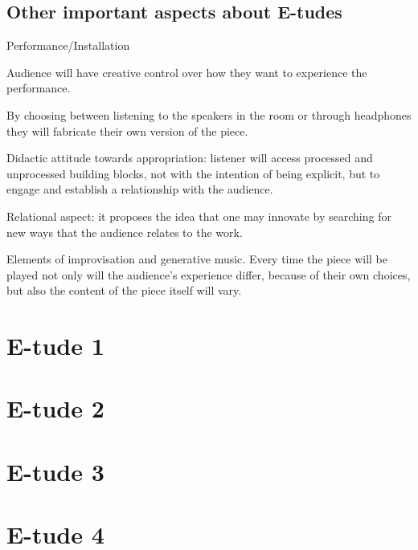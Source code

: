 \subsection{Other important aspects about E-tudes}

Performance/Installation 

Audience will have creative control over how they want to experience the performance.

By choosing between listening to the speakers in the room or through headphones they will fabricate their own version of the piece.

Didactic attitude towards appropriation: listener will access processed and unprocessed building blocks, not with the intention of being explicit, but to engage and establish a relationship with the audience.

Relational aspect: it proposes the idea that one may innovate by searching for new ways that the audience relates to the work.

Elements of improvisation and generative music. Every time the piece will be played not only will the audience’s experience differ, because of their own choices, but also the content of the piece itself will vary.

	
\section{E-tude 1}
\section{E-tude 2}
\section{E-tude 3}
\section{E-tude 4}

\label{ch:etudes}